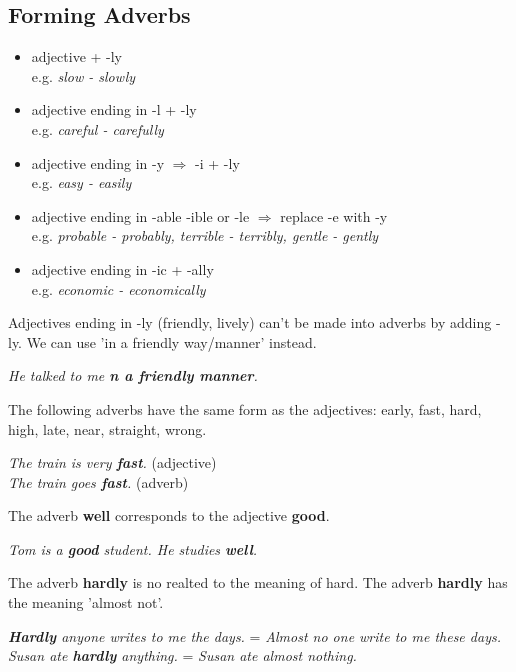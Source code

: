 \documentclass[hidelinks,10pt,a4paper]{article}
\begin{document}
\subsection{Forming Adverbs}
\begin{itemize}
	\item adjective + -ly \\
		e.g. \textit{slow - slowly}
	\item adjective ending in -l + -ly \\
		e.g. \textit{careful - carefully}
	\item adjective ending in -y $\Rightarrow$ -i + -ly \\
		e.g. \textit{easy - easily}
	\item adjective ending in -able -ible or -le $\Rightarrow$ replace -e with -y \\
		e.g. \textit{probable - probably, terrible - terribly, gentle - gently}
	\item adjective ending in -ic + -ally \\
		e.g. \textit{economic - economically}
\end{itemize}

Adjectives ending in -ly (friendly, lively) can't be made into adverbs by adding -ly. We can use 'in a friendly way/manner' instead.

\begin{center}
	\textit{He talked to me \textbf{n a friendly manner}. }
\end{center}

The following adverbs have the same form as the adjectives: early, fast, hard, high, late, near, straight, wrong.

\begin{center}
	\textit{The train is very \textbf{fast}.} (adjective) \\
	\textit{The train goes \textbf{fast}.} (adverb) \\
\end{center}

The adverb \textbf{well} corresponds to the adjective \textbf{good}.

\begin{center}
	\textit{Tom is a \textbf{good} student. He studies \textbf{well}.}
\end{center}

The adverb \textbf{hardly} is no realted to the meaning of hard. The adverb \textbf{hardly} has the meaning 'almost not'.

\begin{center}
 	\textit{\textbf{Hardly} anyone writes to me the days.} = \textit{Almost no one write to me these days.} \\
	\textit{Susan ate \textbf{hardly} anything.} = \textit{Susan ate almost nothing.}
 \end{center}
\end{document}
